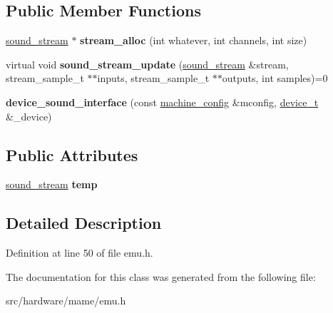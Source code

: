 \subsection*{Public Member Functions}
\begin{DoxyCompactItemize}
\item 
\hypertarget{classdevice__sound__interface_af22910e692172a847190242c43be0674}{\hyperlink{structdevice__sound__interface_1_1sound__stream}{sound\-\_\-stream} $\ast$ {\bfseries stream\-\_\-alloc} (int whatever, int channels, int size)}\label{classdevice__sound__interface_af22910e692172a847190242c43be0674}

\item 
\hypertarget{classdevice__sound__interface_a85526876f197bd5b88e68732911c3151}{virtual void {\bfseries sound\-\_\-stream\-\_\-update} (\hyperlink{structdevice__sound__interface_1_1sound__stream}{sound\-\_\-stream} \&stream, stream\-\_\-sample\-\_\-t $\ast$$\ast$inputs, stream\-\_\-sample\-\_\-t $\ast$$\ast$outputs, int samples)=0}\label{classdevice__sound__interface_a85526876f197bd5b88e68732911c3151}

\item 
\hypertarget{classdevice__sound__interface_a2d24133becedb2e9b2fde03ab5fd3357}{{\bfseries device\-\_\-sound\-\_\-interface} (const \hyperlink{structmachine__config}{machine\-\_\-config} \&mconfig, \hyperlink{classdevice__t}{device\-\_\-t} \&\-\_\-device)}\label{classdevice__sound__interface_a2d24133becedb2e9b2fde03ab5fd3357}

\end{DoxyCompactItemize}
\subsection*{Public Attributes}
\begin{DoxyCompactItemize}
\item 
\hypertarget{classdevice__sound__interface_ad2ec4d6bbaea00c83af32dc7201654a2}{\hyperlink{structdevice__sound__interface_1_1sound__stream}{sound\-\_\-stream} {\bfseries temp}}\label{classdevice__sound__interface_ad2ec4d6bbaea00c83af32dc7201654a2}

\end{DoxyCompactItemize}


\subsection{Detailed Description}


Definition at line 50 of file emu.\-h.



The documentation for this class was generated from the following file\-:\begin{DoxyCompactItemize}
\item 
src/hardware/mame/emu.\-h\end{DoxyCompactItemize}
